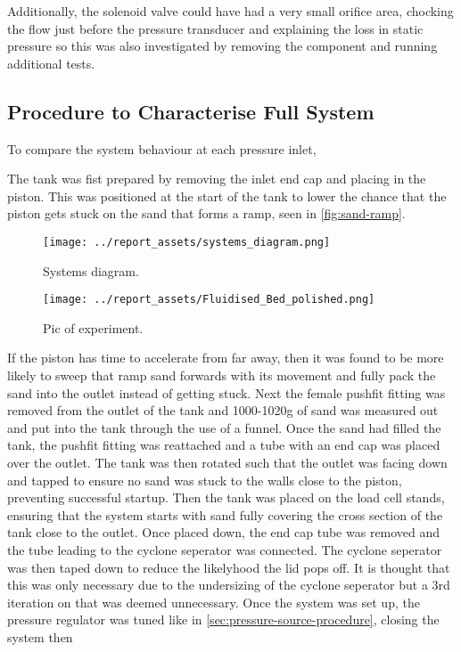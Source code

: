 Additionally, the solenoid valve could have had a very small orifice area, chocking the flow just before the pressure transducer and explaining the loss in static pressure so this was also investigated by removing the component and running additional tests.

\subsection{Procedure to Characterise Full System}
To compare the system behaviour at each pressure inlet, 

The tank was fist prepared by removing the inlet end cap and placing in the piston. This was positioned at the start of the tank to lower the chance that the piston gets stuck on the sand that forms a ramp, seen in \autoref{fig:sand-ramp}.
\begin{figure}[htbp]
    \centering
    
    \begin{minipage}{0.45\textwidth}
        \centering
        \texttt{[image: ../report\_assets/systems\_diagram.png]}
        \caption{Systems diagram.}\label{fig:sand-ramp}
    \end{minipage}
    \hfill
    \begin{minipage}{0.45\textwidth}
        \centering
        \texttt{[image: ../report\_assets/Fluidised\_Bed\_polished.png]}
        \caption{Pic of experiment.}\label{fig:wawaweewa}
    \end{minipage}
    
\end{figure}
If the piston has time to accelerate from far away, then it was found to be more likely to sweep that ramp sand forwards with its movement and fully pack the sand into the outlet instead of getting stuck. Next the female pushfit fitting was removed from the outlet of the tank and 1000-1020g of sand was measured out and put into the tank through the use of a funnel. Once the sand had filled the tank, the pushfit fitting was reattached and a tube with an end cap was placed over the outlet. The tank was then rotated such that the outlet was facing down and tapped to ensure no sand was stuck to the walls close to the piston, preventing successful startup. Then the tank was placed on the load cell stands, ensuring that the system starts with sand fully covering the cross section of the tank close to the outlet. Once placed down, the end cap tube was removed and the tube leading to the cyclone seperator was connected. The cyclone seperator was then taped down to reduce the likelyhood the lid pops off. It is thought that this was only necessary due to the undersizing of the cyclone seperator but a 3rd iteration on that was deemed unnecessary. Once the system was set up, the pressure regulator was tuned like in \autoref{sec:pressure-source-procedure}, closing the system then 
\newpage
